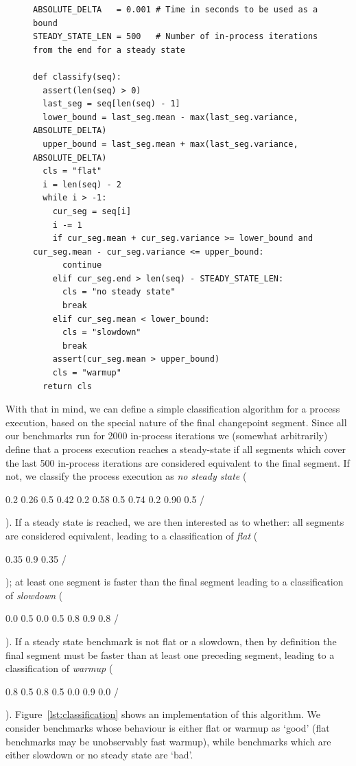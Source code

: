 \documentclass[acmlarge]{acmart}\settopmatter{printfolios=true}
\DeclareRobustCommand{\flatc}{%
\setlength{\sparklinethickness}{0.4pt}%
\begin{sparkline}{1.5}
\spark 0.1 0.35
       0.9 0.35
       /%
\end{sparkline}\xspace%
}
\DeclareRobustCommand{\nosteadystate}{%
\setlength{\sparklinethickness}{0.4pt}%
\begin{sparkline}{1.5}
\spark 0.1 0.2
       0.26 0.5
       0.42 0.2
       0.58 0.5
       0.74 0.2
       0.90 0.5
       /%
\end{sparkline}\xspace%
}
\DeclareRobustCommand{\warmup}{%
\setlength{\sparklinethickness}{0.4pt}%
\begin{sparkline}{1.5}
\spark 0.1 0.8
       0.5 0.8
       0.5 0.0
       0.9 0.0
       /%
\end{sparkline}\xspace%
}
\DeclareRobustCommand{\slowdown}{%
\setlength{\sparklinethickness}{0.4pt}%
\begin{sparkline}{1.5}
\spark 0.1 0.0
       0.5 0.0
       0.5 0.8
       0.9 0.8
       /%
\end{sparkline}\xspace%
}
\begin{document}
\begin{figure}[t]
\begin{lstlisting}[label=lst:classification, xleftmargin=0cm, caption={The
classification algorithm for an individual process execution. Given an ordered
list of Segments -- each of which has "mean", "variance", and "end" attributes, the latter
its absolute ending position in the sequence of in-process iterations --
this function returns a string classifying the run sequence's warmup style.}]
ABSOLUTE_DELTA   = 0.001 # Time in seconds to be used as a bound
STEADY_STATE_LEN = 500   # Number of in-process iterations from the end for a steady state

def classify(seq):
  assert(len(seq) > 0)
  last_seg = seq[len(seq) - 1]
  lower_bound = last_seg.mean - max(last_seg.variance, ABSOLUTE_DELTA)
  upper_bound = last_seg.mean + max(last_seg.variance, ABSOLUTE_DELTA)
  cls = "flat"
  i = len(seq) - 2
  while i > -1:
    cur_seg = seq[i]
    i -= 1
    if cur_seg.mean + cur_seg.variance >= lower_bound and cur_seg.mean - cur_seg.variance <= upper_bound:
      continue
    elif cur_seg.end > len(seq) - STEADY_STATE_LEN:
      cls = "no steady state"
      break
    elif cur_seg.mean < lower_bound:
      cls = "slowdown"
      break
    assert(cur_seg.mean > upper_bound)
    cls = "warmup"
  return cls
\end{lstlisting}
\vspace{-.75cm}
\end{figure}

With that in mind, we can define a simple classification algorithm for a process
execution, based on the special nature of the final changepoint segment. Since all our benchmarks run
for 2000 in-process iterations we (somewhat arbitrarily) define that a process
execution reaches a steady-state if all segments which cover the last 500
in-process iterations are considered equivalent to the final segment. If
not, we classify the process execution as \emph{no steady state} (\nosteadystate).
If a steady state is reached, we are then interested as to whether: all
segments are considered equivalent, leading to a classification of \emph{flat} (\flatc);
at least one segment is faster than the final segment leading to a classification
of \emph{slowdown} (\slowdown). If a steady state benchmark is not flat or a
slowdown, then by definition the final segment must be faster than
at least one preceding segment, leading to a classification of \emph{warmup} (\warmup).
Figure~\ref{lst:classification} shows an implementation of this algorithm.
We consider benchmarks whose behaviour is either flat or warmup
as `good' (flat benchmarks may be unobservably fast warmup), while
benchmarks which are either slowdown or no steady state are `bad'.
\end{document}
